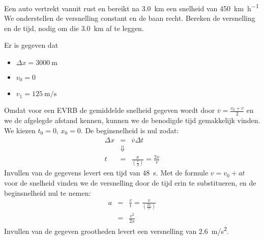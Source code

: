 \documentclass{ximera}
\begin{document}
\begin{exercise}
    Een auto vertrekt vanuit rust en bereikt na \SI{3,0}{km} een snelheid van \SI{450}{\kilo\meter\per\hour} We onderstellen de versnelling constant en de baan recht. Bereken de versnelling en de tijd, nodig om die \SI{3,0}{km} af te leggen.
\begin{oplossing}
    Er is gegeven dat 
    \begin{itemize}
        \item \( \Delta x  = \SI{3000}{\meter}\)
        \item \(v_0 = 0\)
        \item \(v_1 = \SI{125}{\meter\per\second}\)
    \end{itemize}

    Omdat voor een EVRB de gemiddelde snelheid gegeven wordt door $\overline{v}=\frac{v_0+v}{2}$ en we de afgelegde afstand kennen, kunnen we de benodigde tijd gemakkelijk vinden. We kiezen $t_0=0$, $x_0=0$. De beginsnelheid is nul zodat:
    \begin{eqnarray*}
        \Delta x &=& \overline{v}\Delta t \\
        &\Downarrow & \\
        t &=& \frac{x}{\left(\frac{v}{2}\right)} = \frac{2x}{v}
    \end{eqnarray*}
    Invullen van de gegevens levert een tijd van \SI{48}{s}. Met de formule $v=v_0+at$ voor de snelheid vinden we de versnelling door de tijd erin te substitueren, en de beginsnelheid nul te nemen:
    \begin{eqnarray*}
        a &=& \frac{v}{t}=\frac{v}{\left(\frac{2x}{v}\right)}\\
        &=& \frac{v^2}{2x}
    \end{eqnarray*}
    Invullen van de gegeven grootheden levert een versnelling van \SI{2,6}{m/s^2}.
\end{oplossing}
\end{exercise}
\end{document}
